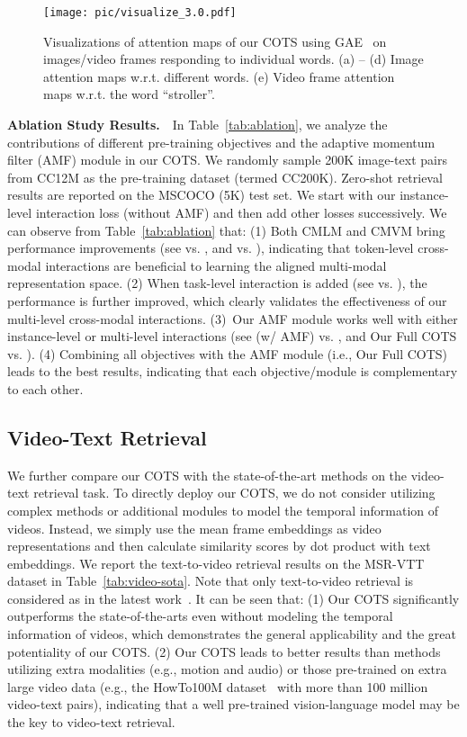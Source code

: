 \documentclass[10pt,twocolumn,letterpaper]{article}
\begin{document}
\begin{figure*}[ht]
    \centering
    \texttt{[image: pic/visualize\_3.0.pdf]}
    \vspace{-0.1in}
    \caption{
    Visualizations of attention maps of our COTS using GAE~\cite{chefer2021generic} on images/video frames responding to individual words. (a) -- (d) Image attention maps w.r.t. different words. (e) Video frame attention maps w.r.t. the word ``stroller''.
    }
    \label{fig:vis}
    \vspace{-0.1in}
\end{figure*}


\noindent\textbf{Ablation Study Results.}~~In Table~\ref{tab:ablation}, we analyze the contributions of different pre-training objectives and the adaptive momentum filter (AMF) module in our COTS. We randomly sample 200K image-text pairs from CC12M as the pre-training dataset (termed CC200K). Zero-shot retrieval results are reported on the MSCOCO (5K) test set. We start with our instance-level interaction loss  (without AMF) and then add other losses successively. We can observe from Table~\ref{tab:ablation} that: (1) Both CMLM and CMVM bring performance improvements (see  vs. , and  vs. ), indicating that token-level cross-modal interactions are beneficial to learning the aligned multi-modal representation space. (2) When task-level interaction is added (see  vs. ), the performance is further improved, which clearly validates the effectiveness of our multi-level cross-modal interactions. (3)~Our AMF module works well with either instance-level or multi-level interactions (see  (w/ AMF) vs. , and Our Full COTS vs. ). (4) Combining all objectives with the AMF module (i.e., Our Full COTS) leads to the best results, indicating that each objective/module is complementary to each other.


\subsection{Video-Text Retrieval}
\label{video}

We further compare our COTS with the state-of-the-art methods on the video-text retrieval task. To directly deploy our COTS, we do not consider utilizing complex methods or additional modules to model the temporal information of videos. Instead, we simply use the mean frame embeddings as video representations and then calculate similarity scores by dot product with text embeddings.
We report the text-to-video retrieval results on the MSR-VTT dataset in Table~\ref{tab:video-sota}. Note that only text-to-video retrieval is considered as in the latest work~\cite{bain2021frozen}. It can be seen that: (1) Our COTS significantly outperforms the state-of-the-arts even without modeling the temporal information of videos, which demonstrates the general applicability and the great potentiality of our COTS. (2) Our COTS leads to better results than methods utilizing extra modalities (e.g., motion and audio) or those pre-trained on extra large video data (e.g., the HowTo100M dataset~\cite{miech2019howto100m} with more than 100 million video-text pairs), indicating that a well pre-trained vision-language model may be the key to video-text retrieval. 
\end{document}
